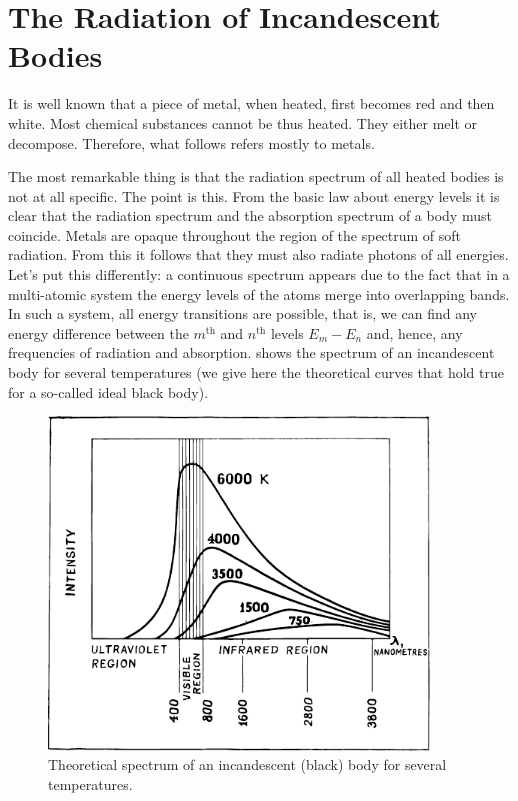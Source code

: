 \section{The Radiation of Incandescent Bodies}
It is well known that a piece of metal, when heated, first becomes red and then white. Most chemical substances cannot be thus heated. They either melt or decompose. Therefore, what follows refers mostly to metals.

The most remarkable thing is that the radiation spectrum of all heated bodies is not at all specific. The point is this. From the basic law about energy levels it is clear that the radiation spectrum and the absorption spectrum of a body must coincide. Metals are opaque throughout the region of the spectrum of soft radiation. From this it follows that they must also radiate photons of all energies.
\label{bbr-ref}
Let's put this differently: a continuous spectrum appears due to the fact that in a multi-atomic system the energy levels of the atoms merge into overlapping bands. In such a system, all energy transitions are possible, that is, we can find any energy difference between the $m^{\textrm{th}}$ and $n^{\textrm{th}}$ levels $E_{m} - E_{n}$ and, hence, any frequencies of radiation and absorption.  shows the spectrum of an incandescent body for several temperatures (we give here the theoretical curves that hold true for a so-called ideal black body).
\begin{figure}[!ht]
\centering
\includegraphics[width=0.9\textwidth]{figures/fig-01-01.pdf}
\caption{Theoretical spectrum of an incandescent (black) body for several temperatures.}
\label{fig-1.1}
\end{figure}


